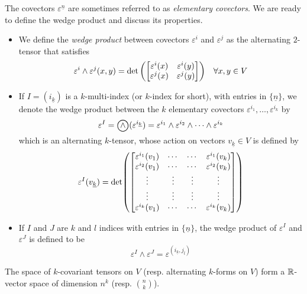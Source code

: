 \documentclass[../main-v2-manifolds.tex]{subfiles}
\begin{document}
The covectors $\varepsilon^{\underline{n}}$ are sometimes referred to as \emph{elementary covectors}. We are ready to define the wedge product and discuss its properties.
\begin{itemize}
    \item We define the \emph{wedge product} between covectors $\varepsilon^i$ and $\varepsilon^j$ as the alternating $2$-tensor that satisfies
    \[
        \varepsilon^i\wedge \varepsilon^j(x,y) = \det\qty(\mqty[\varepsilon^i(x) & \varepsilon^i(y) \\ \varepsilon^j(x) & \varepsilon^j(y)])\quad \forall x,y\in V
    \]
    \item If $I = (i_{\underline{k}})$ is a $k$-multi-index (or $k$-index for short), with entries in $\{\underline{n}\}$, we denote the wedge product between the $k$ elementary covectors $\varepsilon^{i_1},\ldots, \varepsilon^{i_k}$ by
    \[
        \varepsilon^I = \bigowedge(\varepsilon^{i_{\underline{k}}}) = \varepsilon^{i_1}\wedge \varepsilon^{i_2}\wedge\cdots\wedge \varepsilon^{i_k}
    \]
    which is an alternating $k$-tensor, whose action on vectors $v_{\underline{k}}\in V$ is defined by
    \[
        \varepsilon^I(v_{\underline{k}}) = \det(\mqty[\varepsilon^{i_1}(v_1) & \cdots &\cdots &\varepsilon^{i_1}(v_k) \\ \varepsilon^{i_2}(v_1) & \cdots &\cdots &\varepsilon^{i_2}(v_k) \\ \vdots & \vdots & \vdots & \vdots \\ \vdots & \vdots & \vdots & \vdots \\ \varepsilon^{i_k}(v_1) & \cdots & \cdots & \varepsilon^{i_k}(v_k)])
    \]
    \item  If $I$ and $J$ are $k$ and $l$ indices with entries in $\{\underline{n}\}$, the wedge product of $\varepsilon^I$ and $\varepsilon^J$ is defined to be 
    \[
        \varepsilon^I\wedge\varepsilon^J = \varepsilon^{(i_{\underline{k}}, j_{\underline{l}})}
    \]
\end{itemize}
The space of $k$-covariant tensors on $V$ (resp. alternating $k$-forms on $V$) form a $\mathbb{R}$-vector space of dimension $n^k$ (resp. $\binom{n}{k}$). 
\end{document}
